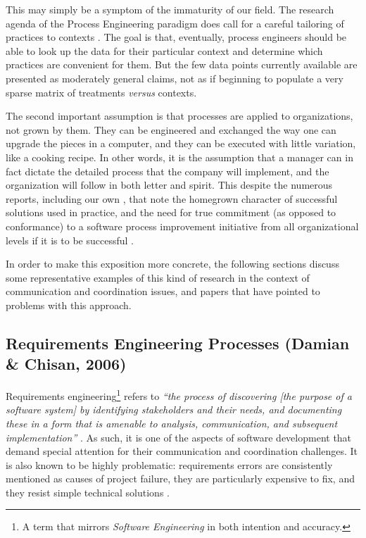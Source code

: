 This may simply be a symptom of the immaturity of our field. The research agenda of the Process Engineering paradigm does call for a careful tailoring of practices to contexts \cite{Kitchenham2004}. The goal is that, eventually, process engineers should be able to look up the data for their particular context and determine which practices are convenient for them. But the few data points currently available are presented as moderately general claims, not as if beginning to populate a very sparse matrix of treatments \emph{versus} contexts.

The second important assumption is that processes are applied to organizations, not grown by them. They can be engineered and exchanged the way one can upgrade the pieces in a computer, and they can be executed with little variation, like a cooking recipe. In other words, it is the assumption that a manager can in fact dictate the detailed process that the company will implement, and the organization will follow in both letter and spirit. This despite the numerous reports, including our own \cite{Aranda2007}, that note the homegrown character of successful solutions used in practice, and the need for true commitment (as opposed to conformance) to a software process improvement initiative from all organizational levels if it is to be successful \cite{Abrahamsson2001}.

In order to make this exposition more concrete, the following sections discuss some representative examples of this kind of research in the context of communication and coordination issues, and papers that have pointed to problems with this approach.


\subsection{Requirements Engineering Processes (Damian \& Chisan, 2006)}

Requirements engineering\footnote{A term that mirrors \emph{Software Engineering} in both intention and accuracy.} refers to \emph{``the process of discovering [the purpose of a software system] by identifying stakeholders and their needs, and documenting these in a form that is amenable to analysis, communication, and subsequent implementation''} \cite{Nuseibeh2000}. As such, it is one of the aspects of software development that demand special attention for their communication and coordination challenges. It is also known to be highly problematic: requirements errors are consistently mentioned as causes of project failure, they are particularly expensive to fix, and they resist simple technical solutions \cite{Boehm1988}.

